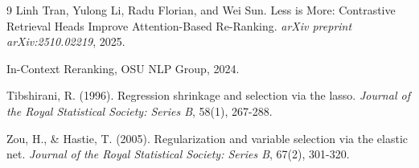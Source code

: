 \documentclass[11pt,a4paper]{article}
\begin{document}

\begin{thebibliography}{9}
Linh Tran, Yulong Li, Radu Florian, and Wei Sun. Less is More: Contrastive Retrieval Heads Improve Attention-Based Re-Ranking. \textit{arXiv preprint arXiv:2510.02219}, 2025.

In-Context Reranking, OSU NLP Group, 2024.

Tibshirani, R. (1996). Regression shrinkage and selection via the lasso. \textit{Journal of the Royal Statistical Society: Series B}, 58(1), 267-288.

Zou, H., \& Hastie, T. (2005). Regularization and variable selection via the elastic net. \textit{Journal of the Royal Statistical Society: Series B}, 67(2), 301-320.
\end{thebibliography}
\end{document}
